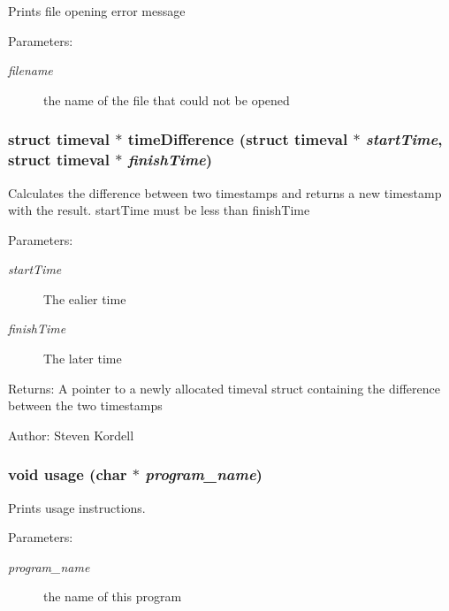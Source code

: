 Prints file opening error message \begin{Desc}
\item[Parameters:]
\begin{description}
\item[{\em filename}]the name of the file that could not be opened \end{description}
\end{Desc}
\subsubsection{\setlength{\rightskip}{0pt plus 5cm}struct timeval $\ast$ time\-Difference (struct timeval $\ast$ {\em start\-Time}, struct timeval $\ast$ {\em finish\-Time})}\label{cptest_8c_af14519feda0f9ad7678c459407b7db6}


Calculates the difference between two timestamps and returns a new timestamp with the result. start\-Time must be less than finish\-Time \begin{Desc}
\item[Parameters:]
\begin{description}
\item[{\em start\-Time}]The ealier time \item[{\em finish\-Time}]The later time \end{description}
\end{Desc}
\begin{Desc}
\item[Returns:]A pointer to a newly allocated timeval struct containing the difference between the two timestamps \end{Desc}
\begin{Desc}
\item[Author:]Steven Kordell \end{Desc}
\subsubsection{\setlength{\rightskip}{0pt plus 5cm}void usage (char $\ast$ {\em program\_\-name})}\label{cptest_8c_be689503cb8eba508fa6380f8d476088}


Prints usage instructions. \begin{Desc}
\item[Parameters:]
\begin{description}
\item[{\em program\_\-name}]the name of this program \end{description}
\end{Desc}
